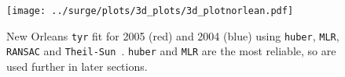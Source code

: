 \begin{figure}
\centering
\texttt{[image: ../surge/plots/3d\_plots/3d\_plotnorlean.pdf]}
 \caption{New Orleans \texttt{tyr} fit for 2005 (red) and 2004 (blue) using
 \texttt{huber}, \texttt{MLR}, \texttt{RANSAC} and \texttt{Theil-Sun }.
 \texttt{huber} and \texttt{MLR} are the most reliable, so are used further in later
 sections.}
 \label{fig:tau-tau-r-no}
\end{figure}
